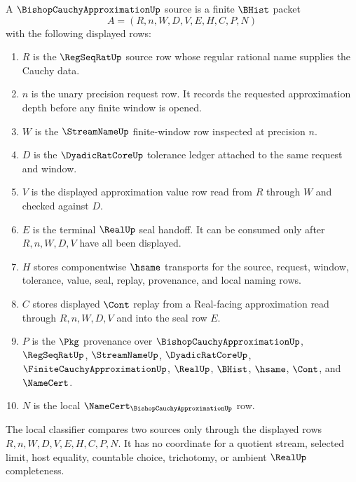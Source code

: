 \begin{definition}
\label{def:bishop-cauchy-approximation-source}
A $\BishopCauchyApproximationUp$ source is a finite $\BHist$ packet
$$
A=(R,n,W,D,V,E,H,C,P,N)
$$
with the following displayed rows:
\begin{enumerate}
\item $R$ is the $\RegSeqRatUp$ source row whose regular rational name supplies the Cauchy data.
\item $n$ is the unary precision request row. It records the requested approximation depth before any finite window is opened.
\item $W$ is the $\StreamNameUp$ finite-window row inspected at precision $n$.
\item $D$ is the $\DyadicRatCoreUp$ tolerance ledger attached to the same request and window.
\item $V$ is the displayed approximation value row read from $R$ through $W$ and checked against $D$.
\item $E$ is the terminal $\RealUp$ seal handoff. It can be consumed only after $R,n,W,D,V$ have all been displayed.
\item $H$ stores componentwise $\hsame$ transports for the source, request, window, tolerance, value, seal, replay, provenance, and local naming rows.
\item $C$ stores displayed $\Cont$ replay from a Real-facing approximation read through $R,n,W,D,V$ and into the seal row $E$.
\item $P$ is the $\Pkg$ provenance over $\BishopCauchyApproximationUp$, $\RegSeqRatUp$, $\StreamNameUp$, $\DyadicRatCoreUp$, $\FiniteCauchyApproximationUp$, $\RealUp$, $\BHist$, $\hsame$, $\Cont$, and $\NameCert$.
\item $N$ is the local $\NameCert_{\BishopCauchyApproximationUp}$ row.
\end{enumerate}
The local classifier compares two sources only through the displayed rows $R,n,W,D,V,E,H,C,P,N$. It has no coordinate for a quotient stream, selected limit, host equality, countable choice, trichotomy, or ambient $\RealUp$ completeness.
\end{definition}

